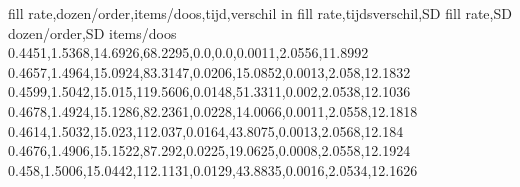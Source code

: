 fill rate,dozen/order,items/doos,tijd,verschil in fill rate,tijdsverschil,SD fill rate,SD dozen/order,SD items/doos
0.4451,1.5368,14.6926,68.2295,0.0,0.0,0.0011,2.0556,11.8992
0.4657,1.4964,15.0924,83.3147,0.0206,15.0852,0.0013,2.058,12.1832
0.4599,1.5042,15.015,119.5606,0.0148,51.3311,0.002,2.0538,12.1036
0.4678,1.4924,15.1286,82.2361,0.0228,14.0066,0.0011,2.0558,12.1818
0.4614,1.5032,15.023,112.037,0.0164,43.8075,0.0013,2.0568,12.184
0.4676,1.4906,15.1522,87.292,0.0225,19.0625,0.0008,2.0558,12.1924
0.458,1.5006,15.0442,112.1131,0.0129,43.8835,0.0016,2.0534,12.1626
